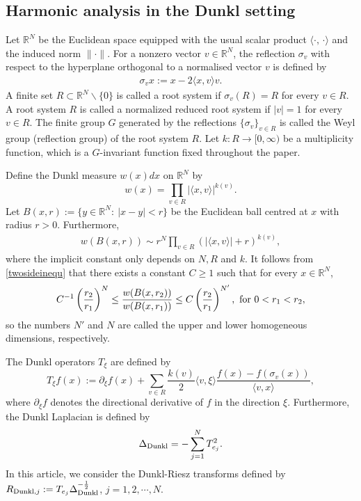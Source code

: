 \documentclass{amsart}
\numberwithin{equation}{section}
\begin{document}
\subsection{Harmonic analysis in the Dunkl setting}
Let $\mathbb{R}^N$ be the Euclidean space equipped with the usual scalar product $\langle \cdot,\,\cdot\rangle $ and the induced norm $\|\cdot\|$. For a nonzero vector $v\in \mathbb{R}^N$, the reflection $\sigma_v$ with respect to the hyperplane orthogonal to a normalised vector $v$ is defined by
\begin{align*}
	\sigma_v x:= x-2\langle x,v\rangle v.
\end{align*}
A finite set $R\subset \mathbb{R}^N\backslash \{0\}$ is called a root system if $\sigma_v(R)=R$ for every $v\in R$. A root system $R$ is called a normalized reduced root system if  $|v|=1$ for every $v\in R.$
The finite group $G$ generated by the reflections $\{\sigma_v\}_{v\in R}$ is called the Weyl group (reflection group) of the root system $R$.
Let $k: R \to [0,\infty)$ be a multiplicity function, which is a $G$-invariant function  fixed throughout the paper.

Define the Dunkl measure $w(x)dx$ on $\mathbb{R}^N$ by
$$w(x)=\prod_{v \in R} |\langle x,v\rangle|^{k(v)}.$$
Let $B(x,r):=\{y\in \mathbb{R}^N:\ |x-y|< r\}$ be the Euclidean ball centred at $x$ with radius $r>0$.
Furthermore,
\begin{align}\label{twosideinequ}
  w(B(x,r))\sim r^N \prod_{v \in R}(|\langle x, v \rangle |+r)^{k(v)},
\end{align}
where the implicit constant only depends on $N,R$ and $k$.  It follows from \eqref{twosideinequ} that there exists a constant $C\geq 1$ such that for every $x\in \mathbb{R}^N$,
\begin{align}\label{doublinginequality}
C^{-1}\left(\frac{r_2}{r_1}\right)^N\leq \frac{w(B(x,r_2))}{w(B(x,r_1))}\leq C\left(\frac{r_2}{r_1}\right)^{N'},\ {\rm for}\ 0<r_1<r_2,
\end{align}
so the numbers $N'$ and $N$ are called the upper and lower homogeneous dimensions, respectively.

The Dunkl operators $T_\xi$ are defined by
$$T_\xi f(x):=\partial_\xi f(x)+\sum_{v\in R}\frac{k(v)}{2}\langle v,\xi\rangle\frac{f(x)-f(\sigma_v(x))}{\langle v,x\rangle},$$
where $\partial_\xi f$ denotes the directional derivative of $f$ in the direction $\xi$. Furthermore, the Dunkl Laplacian is defined by
$$\Delta_{{\rm Dunkl}}=-\sum_{j=1}^N T_{e_j}^2.$$
In this article, we consider the Dunkl-Riesz transforms defined by $R_{{\rm Dunkl},j}:=T_{e_j}\Delta_{{\rm Dunkl}}^{-\frac12}$, $j=1,2,\cdots,N.$
\end{document}
